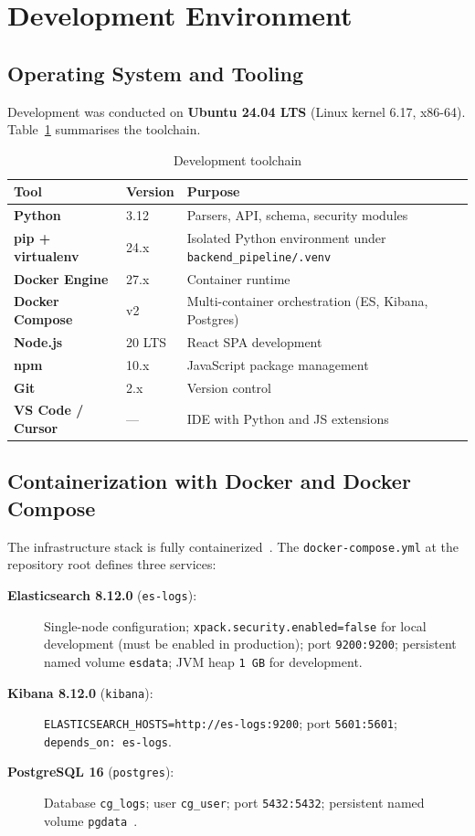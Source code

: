 \documentclass[12pt,a4paper,oneside]{report}
\newcommand{\rowA}{\rowcolor{rowgray}}
\begin{document}
\section{Development Environment}

\subsection{Operating System and Tooling}

Development was conducted on \textbf{Ubuntu 24.04 LTS} (Linux kernel 6.17, x86-64).
Table~\ref{tab:devtools} summarises the toolchain.

\begin{table}[H]
\centering
\caption{Development toolchain}
\label{tab:devtools}
\begin{tabularx}{\textwidth}{@{}>{\bfseries}p{3cm} p{2.8cm} X@{}}
\toprule
Tool & Version & Purpose \\
\midrule
\rowA Python & 3.12 & Parsers, API, schema, security modules \\
pip + virtualenv & 24.x & Isolated Python environment under \texttt{backend\_pipeline/.venv} \\
\rowA Docker Engine & 27.x & Container runtime \\
Docker Compose & v2 & Multi-container orchestration (ES, Kibana, Postgres) \\
\rowA Node.js & 20 LTS & React SPA development \\
npm & 10.x & JavaScript package management \\
\rowA Git & 2.x & Version control \\
VS Code / Cursor & --- & IDE with Python and JS extensions \\
\bottomrule
\end{tabularx}
\end{table}

\subsection{Containerization with Docker and Docker Compose}

The infrastructure stack is fully containerized~\cite{dockerDocs}.
The \texttt{docker-compose.yml} at the repository root defines three services:

\begin{description}
  \item[\textbf{Elasticsearch 8.12.0} (\texttt{es-logs}):] Single-node configuration; \texttt{xpack.security.enabled=false} for local development (must be enabled in production); port \texttt{9200:9200}; persistent named volume \texttt{esdata}; JVM heap \texttt{1\,GB} for development.
  \item[\textbf{Kibana 8.12.0} (\texttt{kibana}):] \texttt{ELASTICSEARCH\_HOSTS=http://es-logs:9200}; port \texttt{5601:5601}; \texttt{depends\_on: es-logs}.
  \item[\textbf{PostgreSQL 16} (\texttt{postgres}):] Database \texttt{cg\_logs}; user \texttt{cg\_user}; port \texttt{5432:5432}; persistent named volume \texttt{pgdata}~\cite{postgres16}.
\end{description}
\end{document}
